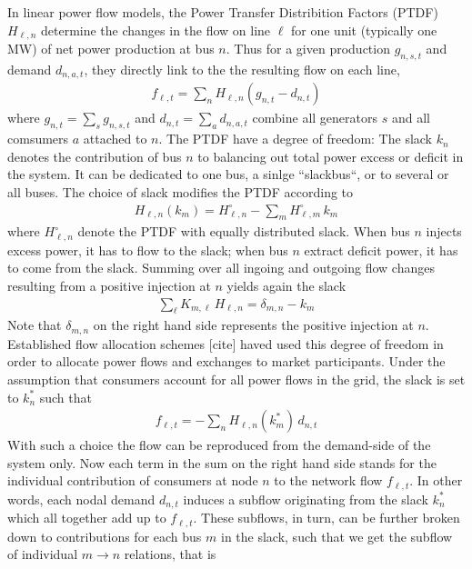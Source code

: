 \documentclass[11pt,twocolumn]{article}
\newcommand{\generation}[1][n]{g_{#1,s,t}}
\newcommand{\nodalgeneration}[1][n]{g_{#1,t}}
\newcommand{\demand}[1][n]{d_{#1,a,t}}
\newcommand{\nodaldemand}[1][n]{d_{#1,t}}
\newcommand{\incidence}[1][n]{K_{#1,\ell}}
\newcommand{\ptdf}[1][n]{H_{\ell,#1}}
\newcommand{\ptdfEqual}[1][n]{\ptdf[#1]^\circ}
\newcommand{\slack}[1][n]{k_{#1}}
\newcommand{\slackk}[1][n]{k^*_{#1}}
\newcommand{\flow}{f_{\ell,t}}
\begin{document}
In linear power flow models, the Power Transfer Distribition Factors (PTDF) $\ptdf$ determine the changes in the flow on line $\ell$ for one unit (typically one MW) of net power production at bus $n$. Thus for a given production $\generation$ and demand $\demand$, they directly link to the the resulting flow on each line, 
\begin{align}
 \flow  =   \sum_n \ptdf  \left( \nodalgeneration- \nodaldemand \right)    
 \label{eq:flow_from_ptdf}
\end{align}
where $\nodalgeneration = \sum_s \generation$ and $\nodaldemand = \sum_a \demand$ combine all generators $s$ and all comsumers $a$ attached to $n$.
The PTDF have a degree of freedom: The slack $\slack$ denotes the contribution of bus $n$ to balancing out total power excess or deficit in the system. It can be dedicated to one bus, a sinlge ``slackbus``, or to several or all buses. The choice of slack modifies the PTDF according to 
\begin{align}
 \ptdf\left( \slack[m]\right)  = \ptdfEqual - \sum_m \ptdfEqual[m]  \, \slack[m]
 \label{eq:ptdf_slacked}
\end{align}
where $\ptdfEqual$ denote the PTDF with equally distributed slack.
When bus $n$ injects excess power, it has to flow to the slack; when bus $n$ extract deficit power, it has to come from the slack. Summing over all ingoing and outgoing flow changes resulting from a positive injection at $n$ yields again the slack 
\begin{align}
\sum_\ell \incidence[m] \, \ptdf =  \delta_{m,n} - \slack[m] 
\label{eq:slack}
\end{align}
Note that $\delta_{m,n}$ on the right hand side represents the positive injection at $n$.
Established flow allocation schemes [cite] haved used this degree of freedom in order to allocate power flows and exchanges to market participants. Under the assumption that consumers account for all power flows in the grid, the slack is set to $\slack^*$ such that 
\begin{align}
 \flow  = - \sum_n \ptdf\left( \slackk[m]\right) \, \nodaldemand  
 \label{eq:flow_from_demand}
\end{align}
With such a choice the flow can be reproduced from the demand-side of the system only. Now each term in the sum on the right hand side stands for the individual contribution of consumers at node $n$ to the network flow $\flow$. In other words, each nodal demand $\nodaldemand$ induces a subflow originating from the slack $\slackk$ which all together add up to $\flow$. These subflows, in turn, can be further broken down to contributions for each bus $m$ in the slack, such that we get the subflow of individual $m \rightarrow n$ relations, that is 
\end{document}
